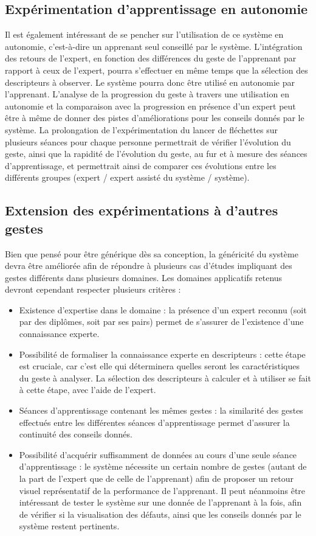 \subsection{Expérimentation d'apprentissage en autonomie}
Il est également intéressant de se pencher sur l'utilisation de ce système en autonomie, c'est-à-dire un apprenant seul conseillé par le système. L'intégration des retours de l'expert, en fonction des différences du geste de l'apprenant par rapport à ceux de l'expert, pourra s'effectuer en même temps que la sélection des descripteurs à observer. Le système pourra donc être utilisé en autonomie par l'apprenant. L'analyse de la progression du geste à travers une utilisation en autonomie et la comparaison avec la progression en présence d'un expert peut être à même de donner des pistes d'améliorations pour les conseils donnés par le système. La prolongation de l'expérimentation du lancer de fléchettes sur plusieurs séances pour chaque personne permettrait de vérifier l'évolution du geste, ainsi que la rapidité de l'évolution du geste, au fur et à mesure des séances d'apprentissage, et permettrait ainsi de comparer ces évolutions entre les différents groupes (expert  / expert assisté du système / système).

\subsection{Extension des expérimentations à d'autres gestes}
Bien que pensé pour être générique dès sa conception, la généricité du système devra être améliorée afin de répondre à plusieurs cas d'études impliquant des gestes différents dans plusieurs domaines. Les domaines applicatifs retenus devront cependant respecter plusieurs critères :
\begin{itemize}
	\item Existence d'expertise dans le domaine : la présence d'un expert reconnu (soit par des diplômes, soit par ses pairs) permet de s'assurer de l'existence d'une connaissance experte.
	\item Possibilité de formaliser la connaissance experte en descripteurs : cette étape est cruciale, car c'est elle qui déterminera quelles seront les caractéristiques du geste à analyser. La sélection des descripteurs à calculer et à utiliser se fait à cette étape, avec l'aide de l'expert.
	\item Séances d'apprentissage contenant les mêmes gestes : la similarité des gestes effectués entre les différentes séances d'apprentissage permet d'assurer la continuité des conseils donnés.
	\item Possibilité d'acquérir suffisamment de données au cours d'une seule séance d'apprentissage : le système nécessite un certain nombre de gestes (autant de la part de l'expert que de celle de l'apprenant) afin de proposer un retour visuel représentatif de la performance de l'apprenant. Il peut néanmoins être intéressant de tester le système sur une donnée de l'apprenant à la fois, afin de vérifier si la visualisation des défauts, ainsi que les conseils donnés par le système restent pertinents.
\end{itemize}

